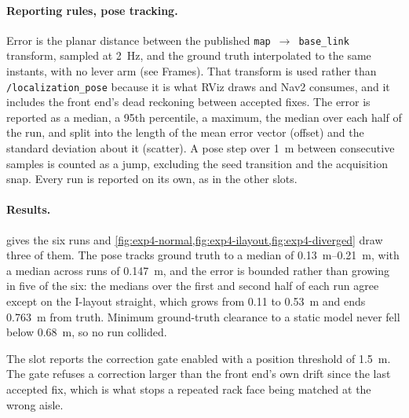 \documentclass[11pt,a4paper,notitlepage]{report}
\begin{document}
\paragraph{Reporting rules, pose tracking.}  Error is the planar distance
between the published \texttt{map}~$\rightarrow$~\texttt{base\_link} transform,
sampled at \SI{2}{\hertz}, and the ground truth interpolated to the same
instants, with no lever arm (see Frames). That transform is used rather than
\texttt{/localization\_pose} because it is what RViz draws and Nav2 consumes,
and it includes the front end's dead reckoning between accepted fixes. The
error is reported as a median, a 95th percentile, a maximum, the median over
each half of the run, and split into the length of the mean error vector
(offset) and the standard deviation about it (scatter). A pose step over
\SI{1}{\metre} between consecutive samples is counted as a jump, excluding the
seed transition and the acquisition snap. Every run is reported on its own, as
in the other slots.

\paragraph{Results.}  gives the six runs and
\cref{fig:exp4-normal,fig:exp4-ilayout,fig:exp4-diverged} draw three of them.
The pose tracks ground truth to a median of \SIrange{0.13}{0.21}{\metre},
with a median across runs of \SI{0.147}{\metre}, and the error is bounded
rather than growing in five of the six: the medians over the first and second
half of each run agree except on the I-layout straight, which grows from
\SI{0.11}{} to \SI{0.53}{\metre} and ends \SI{0.763}{\metre} from truth. Minimum ground-truth clearance to a static model
never fell below \SI{0.68}{\metre}, so no run collided.

 The slot reports the correction gate
enabled with a position threshold of
\SI{1.5}{\metre}. The gate refuses a correction
larger than the front end's own drift since the last accepted fix, which is
what stops a repeated rack face being matched at the wrong aisle.
\end{document}
